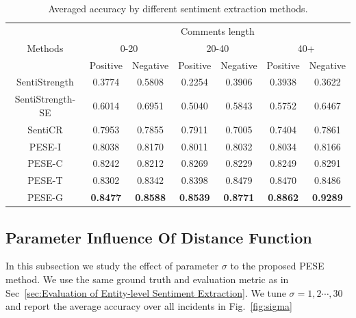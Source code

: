 \documentclass[runningheads]{llncs}
\begin{document}
\vspace{-0.6cm}
\begin{table}
\begin{center}
\begin{tabular}{|c|c|c|c|c|c|c|}
\hline
\multirow{3}{*}{Methods}             & \multicolumn{6}{c|}{Comments length}                                                \\ \cline{2-7} 
                                     & \multicolumn{2}{c|}{0-20} & \multicolumn{2}{c|}{20-40} & \multicolumn{2}{c|}{40+} \\ \cline{2-7} 
                                     & Positive    & Negative    & Positive     & Negative    & Positive     & Negative    \\ \hline
SentiStrength                        & 0.3774      & 0.5808      & 0.2254       & 0.3906      & 0.3938       & 0.3622      \\ \hline
SentiStrength-SE                     & 0.6014      & 0.6951      & 0.5040       & 0.5843      & 0.5752       & 0.6467      \\ \hline
SentiCR                              & 0.7953      & 0.7855      & 0.7911       & 0.7005      & 0.7404       & 0.7861      \\ \hline
 PESE-I                      & 0.8038      & 0.8170      & 0.8011       & 0.8032      & 0.8034       & 0.8166      \\ \hline
PESE-C                      & 0.8242      & 0.8212      & 0.8269       & 0.8229      & 0.8249       & 0.8291     \\ \hline
PESE-T                    & 0.8302      & 0.8342      & 0.8398      & 0.8479      & 0.8470       & 0.8486      \\ \hline
PESE-G                      & \textbf{0.8477}      & \textbf{0.8588}      & \textbf{0.8539}       & \textbf{0.8771}      & \textbf{0.8862}       & \textbf{0.9289}      \\ \hline
\end{tabular}
\caption{Averaged accuracy by different sentiment extraction methods.}\label{table:sentiment classification}
\end{center}
\end{table}



\vspace{-1.5cm}
\subsection{Parameter Influence Of Distance Function}
In this subsection we study the effect of parameter $\sigma$ to the proposed PESE method. We use the same ground truth and evaluation metric as in Sec~\ref{sec:Evaluation of Entity-level Sentiment Extraction}. We tune $\sigma=1,2\cdots,30$ and report the average accuracy over all incidents in Fig.~\ref{fig:sigma}
\end{document}
